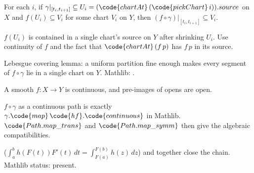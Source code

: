 \begin{lemma}
\label{lem:pcr-r13}
For each $i$, if $\gamma|_{[t_{i},t_{i+1}]}\subseteq U_{i}=
(\code{chartAt}\,(\code{pickChart}\,i)).source$ on $X$ and
$f(U_{i})\subseteq V_{i}$ for some chart $V_{i}$ on $Y$, then
$(f\circ\gamma)|_{[t_{i},t_{i+1}]}\subseteq V_{i}$.
\leanok
\end{lemma}

\begin{lemma}
\label{lem:pcr-r14}
$f(U_{i})$ is contained in a single chart's source on $Y$ after
shrinking $U_{i}$. Use continuity of $f$ and the fact that
$\code{chartAt}\,(f\,p)$ has $f\,p$ in its source.
\leanok
\end{lemma}

\begin{lemma}
\label{lem:pcr-r15}
Lebesgue covering lemma: a uniform partition fine enough makes every
segment of $f\circ\gamma$ lie in a single chart on $Y$.  Mathlib:
.
\leanok\mathlibok
\end{lemma}

\begin{lemma}
\label{lem:pcr-r16}
A smooth $f:X\to Y$ is continuous, and pre-images of opens are open.
\leanok\mathlibok
\end{lemma}

\begin{lemma}
\label{lem:pcr-r17}
$f\circ\gamma$ as a continuous path is exactly $\gamma.\code{map}\,
\code{hf}.\code{continuous}$ in Mathlib.  $\code{Path.map\_trans}$ and
$\code{Path.map\_symm}$ then give the algebraic compatibilities.
\leanok\mathlibok
\end{lemma}

\begin{lemma}
\label{lem:pcr-r18}
($\int_{a}^{b}h(F(t))F'(t)\,dt=\int_{F(a)}^{F(b)}h(z)\,dz$) and
 together close the chain.  Mathlib status: present.
\leanok\mathlibok
\end{lemma}

